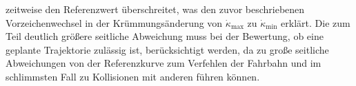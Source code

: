 zeitweise den Referenzwert überschreitet, was den zuvor beschriebenen Vorzeichenwechsel in der Krümmungsänderung von $\dot{\kappa}_{\textrm{max}}$ zu $\dot{\kappa}_{\textrm{min}}$ erklärt. Die zum Teil deutlich größere seitliche Abweichung muss bei der Bewertung, ob eine geplante Trajektorie zulässig ist, berücksichtigt werden, da zu große seitliche Abweichungen von der Referenzkurve zum Verfehlen der Fahrbahn und im schlimmsten Fall zu Kollisionen mit anderen  führen können. 

